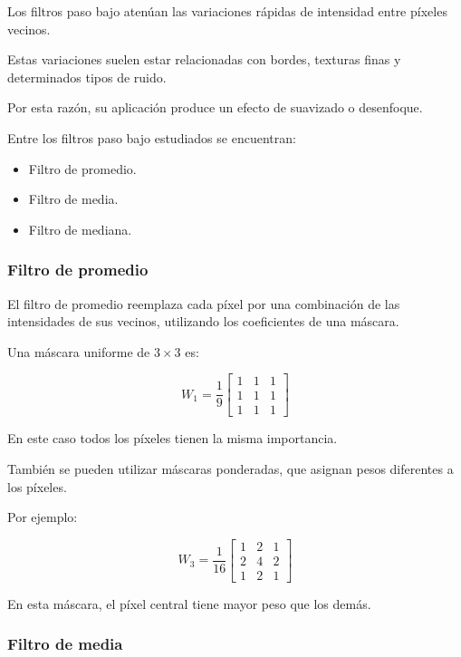 \documentclass[11pt,letterpaper]{article}
\begin{document}
Los filtros paso bajo atenúan las variaciones rápidas
de intensidad entre píxeles vecinos.

Estas variaciones suelen estar relacionadas
con bordes, texturas finas y determinados tipos
de ruido.

Por esta razón, su aplicación produce un efecto
de suavizado o desenfoque.

Entre los filtros paso bajo estudiados se encuentran:

\begin{itemize}

    \item Filtro de promedio.
    \item Filtro de media.
    \item Filtro de mediana.

\end{itemize}

\subsubsection{Filtro de promedio}

El filtro de promedio reemplaza cada píxel por
una combinación de las intensidades de sus vecinos,
utilizando los coeficientes de una máscara.

Una máscara uniforme de $3\times3$ es:

\[
W_1=\frac{1}{9}
\begin{bmatrix}
1&1&1\\
1&1&1\\
1&1&1
\end{bmatrix}
\]

En este caso todos los píxeles tienen
la misma importancia.

También se pueden utilizar máscaras ponderadas,
que asignan pesos diferentes a los píxeles.

Por ejemplo:

\[
W_3=\frac{1}{16}
\begin{bmatrix}
1&2&1\\
2&4&2\\
1&2&1
\end{bmatrix}
\]

En esta máscara, el píxel central tiene
mayor peso que los demás.

\subsubsection{Filtro de media}
\end{document}
